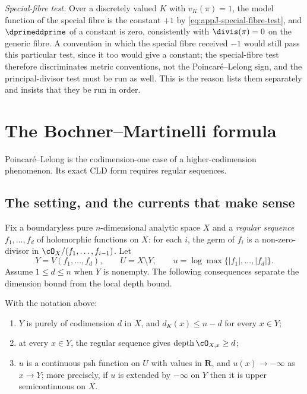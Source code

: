 \emph{Special-fibre test.}  Over a discretely valued $K$ with $v_K(\pi)=1$,
the model function of the special fibre is the constant $+1$ by
\eqref{eq:appJ-special-fibre-test}, and $\dprimeddprime$ of a constant is
zero, consistently with $\divis(\pi)=0$ on the generic fibre.  A convention
in which the special fibre received $-1$ would still pass this particular
test, since it too would give a constant; the special-fibre test therefore
discriminates metric conventions, not the Poincar\'e--Lelong sign, and the
principal-divisor test must be run as well.  This is the reason
 lists them separately and insists that they be run
in order.

\section{The Bochner--Martinelli formula}
\label{sec:ch15-bm}

Poincar\'e--Lelong is the codimension-one case of a higher-codimension
phenomenon.  Its exact CLD form requires regular sequences.

\subsection{The setting, and the currents that make sense}
\label{sec:ch15-bm-setting}

Fix a boundaryless pure $n$-dimensional analytic space $X$ and a
\emph{regular sequence} $f_1,\dots,f_d$ of holomorphic functions on $X$: for
each $i$, the germ of $f_i$ is a non-zero-divisor in
$\cO_X/(f_1,\dots,f_{i-1})$.  Let
\[
 Y=V(f_1,\dots,f_d),\qquad U=X\setminus Y,
 \qquad u=\log\max\{|f_1|,\dots,|f_d|\} .
\]
Assume $1\le d\le n$ when $Y$ is nonempty.  The following consequences
separate the dimension bound from the local depth bound.

\begin{lemma}
\label{lem:ch15-bm-regular}
With the notation above:
\begin{enumerate}
\item\label{itm:ch15-bm-codim} $Y$ is purely of codimension $d$ in $X$, and
  $d_K(x)\le n-d$ for every $x\in Y$;
\item\label{itm:ch15-bm-Sd} at every $x\in Y$, the regular sequence gives
  $\operatorname{depth}\cO_{X,x}\ge d$;
\item\label{itm:ch15-bm-usc} $u$ is a continuous psh function on $U$ with
  values in $\mathbf R$, and $u(x)\to-\infty$ as $x\to Y$; more precisely, if
  $u$ is extended by $-\infty$ on $Y$ then it is upper semicontinuous on $X$.
\end{enumerate}
\end{lemma}

